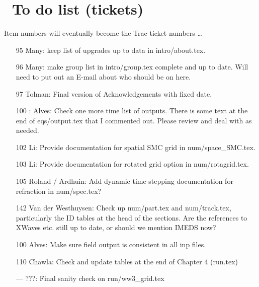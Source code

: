 \pagestyle{myheadings} \setcounter{page}{1} \setcounter{footnote}{0}

\section{~To do list (tickets)} \label{app:to_do}
\newcounters 
\vssub

\noindent
Item numbers will eventually become the Trac ticket numbers \ldots

\begin{itemize}

\item[95] Many: keep list of upgrades up to data in intro/about.tex.

\item[96] Many: make group list in intro/group.tex complete and up to
  date. Will need to put out an E-mail about who should be on here.

\item[97] Tolman: Final version of Acknowledgements with fixed date.

\item[100]: Alves: Check one more time list of outputs. There is some text at
  the end of eqs/output.tex that I commented out. Please review and deal with
  as needed.

\item[102] Li: Provide documentation for spatial SMC grid in num/space\_SMC.tex.

\item[103] Li: Provide documentation for rotated grid option in
  num/rotagrid.tex.

\item[105] Roland / Ardhuin: Add dynamic time stepping documentation for
  refraction in num/spec.tex?

\item[142] Van der Westhuysen: Check up num/part.tex and num/track.tex,
  particularly the ID tables at the head of the sections. Are the references to
  XWaves etc. still up to date, or should we mention IMEDS now?

\item[100] Alves: Make sure field output is consistent in all inp files.

\item[110] Chawla: Check and update tables at the end of Chapter 4 (run.tex)

\item[---] ???: Final sanity check on run/ww3\_grid.tex


\end{itemize}
